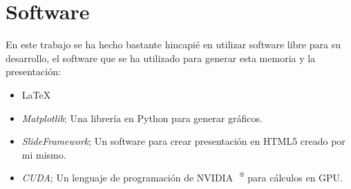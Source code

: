 \chapter*{Software}
En este trabajo se ha hecho bastante hincapié en utilizar software libre para su desarrollo, el software que se ha utilizado para generar esta memoria y la presentación:

\begin{itemize}
	\item \LaTeX
	\item \textit{Matplotlib}; Una librería en Python para generar gráficos.
	\item \textit{SlideFramework}; Un software para crear presentación en HTML5 creado por mi mismo.
	\item \textit{CUDA}; Un lenguaje de programación de NVIDIA $\regmark$ para cálculos en GPU.
\end{itemize}
